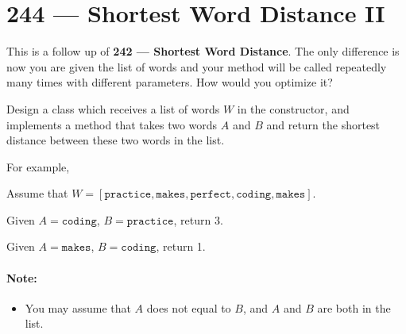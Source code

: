 \section{244 --- Shortest Word Distance II}
This is a follow up of \textbf{242 --- Shortest Word Distance}. The only difference is now you are given the list of words and your method will be called repeatedly many times with different parameters. How would you optimize it?
\par
Design a class which receives a list of words $W$ in the constructor, and implements a method that takes two words $A$ and $B$ and return the shortest distance between these two words in the list.
\par
For example,
\par
Assume that $W = [\texttt{practice}, \texttt{makes}, \texttt{perfect}, \texttt{coding}, \texttt{makes}]$.
\par
Given $A = \texttt{coding}$, $B = \texttt{practice}$, return 3.
\par
Given $A = \texttt{makes}$, $B = \texttt{coding}$, return 1.
\paragraph{Note:}
\begin{itemize}
\item You may assume that $A$ does not equal to $B$, and $A$ and $B$ are both in the list.
\end{itemize}